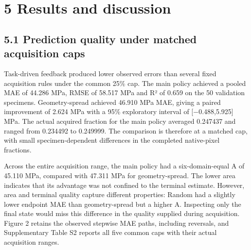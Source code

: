 \section{5 Results and discussion}\label{results-and-discussion}

\subsection{5.1 Prediction quality under matched acquisition caps}\label{prediction-quality-under-matched-acquisition-caps}

Task-driven feedback produced lower observed errors than several fixed acquisition rules under the common 25\% cap. The main policy achieved a pooled MAE of 44.286 MPa, RMSE of 58.517 MPa and R² of 0.659 on the 50 validation specimens. Geometry-spread achieved 46.910 MPa MAE, giving a paired improvement of 2.624 MPa with a 95\% exploratory interval of {[}−0.488,5.925{]} MPa. The actual acquired fraction for the main policy averaged 0.247437 and ranged from 0.234492 to 0.249999. The comparison is therefore at a matched cap, with small specimen-dependent differences in the completed native-pixel fractions.

Across the entire acquisition range, the main policy had a six-domain-equal A of 45.110 MPa, compared with 47.311 MPa for geometry-spread. The lower area indicates that its advantage was not confined to the terminal estimate. However, area and terminal quality capture different properties: Random had a slightly lower endpoint MAE than geometry-spread but a higher A. Inspecting only the final state would miss this difference in the quality supplied during acquisition. Figure 2 retains the observed stepwise MAE paths, including reversals, and Supplementary Table S2 reports all five common caps with their actual acquisition ranges.

